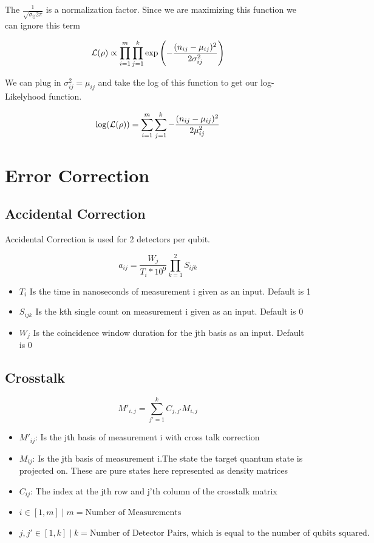 \documentclass{article}
\begin{document}
The $\frac{1}{\sqrt{\sigma_{ij}2\pi}}$ is a normalization factor. Since we are maximizing this
function we can ignore this term

$$\mathcal{L}(\rho) \propto \prod_{i=1}^m \prod_{j=1}^k  \exp\left( -\frac{(n_{ij}-\mu_{ij})^2}{2\sigma_{ij}^2} \right)$$

We can plug in $\sigma_{ij}^2 = \mu_{ij}$ and take the log of this function to get our log-Likelyhood function.

$$\text{log}(\mathcal{L}(\rho)) = \sum_{i=1}^m  \sum_{j=1}^k -\frac{(n_{ij}-\mu_{ij})^2}{2\mu_{ij}^2}$$


\section{Error Correction}

\subsection{Accidental Correction}

Accidental Correction is used for 2 detectors per qubit.

$$a_{ij} = \frac{W_j}{T_i * 10^9}\prod_{k=1}^{2}S_{ijk}$$

\begin{itemize}
\item $T_i$ Is the time in nanoseconds of measurement i given as an input. Default is 1
\item $S_{ijk}$ Is the kth single count on measurement i given as an input. Default is 0
\item $W_j$ Is the coincidence window duration for the jth basis as an input. Default is 0
\end{itemize}

\subsection{Crosstalk}

$$M'_{i,j} = \sum_{j'=1}^{k} C_{j,j'} M_{i,j}$$

\begin{itemize}
\item $M'_{ij}$: Is the jth basis of measurement i with cross talk correction
\item $M_{ij}$: Is the jth basis of measurement i.The state the target quantum state is projected on. These are pure states here represented as density matrices
\item $C_{ij}$: The index at the jth row and j'th column of the crosstalk matrix
\item $i \in[1,m] \; \big| \; m = \text{Number of Measurements}$
\item $j,j' \in[1,k] \; \big| \; k = \text{Number of Detector Pairs, which is equal to the number of qubits squared.}$
\end{itemize}
\end{document}
